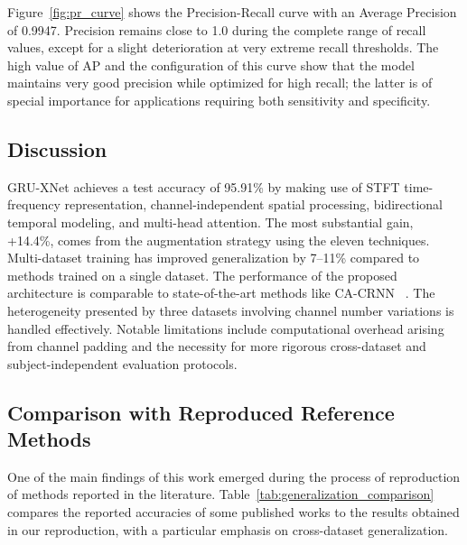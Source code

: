 \documentclass[conference]{IEEEtran}
\begin{document}
Figure~\ref{fig:pr_curve} shows the Precision-Recall curve with an Average Precision of 0.9947. Precision remains close to 1.0 during the complete range of recall values, except for a slight deterioration at very extreme recall thresholds. The high value of AP and the configuration of this curve show that the model maintains very good precision while optimized for high recall; the latter is of special importance for applications requiring both sensitivity and specificity.

\subsection{Discussion}
GRU-XNet achieves a test accuracy of 95.91\% by making use of STFT time-frequency representation, channel-independent spatial processing, bidirectional temporal modeling, and multi-head attention. The most substantial gain, +14.4\%, comes from the augmentation strategy using the eleven techniques. Multi-dataset training has improved generalization by 7--11\% compared to methods trained on a single dataset. The performance of the proposed architecture is comparable to state-of-the-art methods like CA-CRNN~\cite{zhang2025emotion}
. The heterogeneity presented by three datasets involving channel number variations is handled effectively. Notable limitations include computational overhead arising from channel padding and the necessity for more rigorous cross-dataset and subject-independent evaluation protocols.


\subsection{Comparison with Reproduced Reference Methods}

One of the main findings of this work emerged during the process of reproduction of methods reported in the literature. Table~\ref{tab:generalization_comparison} compares the reported accuracies of some published works to the results obtained in our reproduction, with a particular emphasis on cross-dataset generalization.
\end{document}
